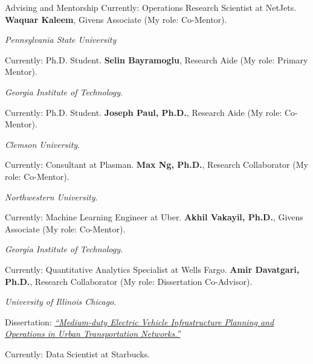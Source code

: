 \begin{rubric}{Advising and Mentorship}
Currently: Operations Research Scientist at NetJets.
\entry*[2024] \textbf{Waquar Kaleem}, Givens Associate (My role: Co-Mentor). \par
\textit{Pennsylvania State University} \par
Currently: Ph.D. Student.
\entry*[2024] \textbf{Selin Bayramoglu}, Research Aide (My role: Primary Mentor). \par
\textit{Georgia Institute of Technology}. \par
Currently: Ph.D. Student.
\entry*[2024] \textbf{Joseph Paul, Ph.D.}, Research Aide (My role: Co-Mentor). \par
\textit{Clemson University}. \par
Currently: Consultant at Plasman.
\entry*[2023 -- 2025] \textbf{Max Ng, Ph.D.}, Research Collaborator (My role: Co-Mentor). \par
\textit{Northwestern University}. \par
Currently: Machine Learning Engineer at Uber.
\entry*[2023] \textbf{Akhil Vakayil, Ph.D.}, Givens Associate (My role: Co-Mentor). \par
\textit{Georgia Institute of Technology}.  \par
Currently: Quantitative Analytics Specialist at Wells Fargo.
\entry*[2022 -- 2024] \textbf{Amir Davatgari, Ph.D.}, Research Collaborator (My role: Dissertation Co-Advisor). \par
\textit{University of Illinois Chicago}. \par
Dissertation: \href{https://indigo.uic.edu/articles/thesis/Medium-duty_Electric_Vehicle_Infrastructure_Planning_and_Operations_in_Urban_Transportation_Networks/26107309?file=47256694}{\emph{``Medium-duty Electric Vehicle Infrastructure Planning and Operations in Urban Transportation Networks.''}} \par
Currently: Data Scientist at Starbucks.
\end{rubric}